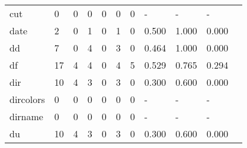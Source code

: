 \begin{longtable}{lp{1.10cm}p{1.10cm}p{1.10cm}p{1.10cm}p{1.10cm}p{1.10cm}p{1.10cm}p{1.10cm}p{1.10cm}p{1.10cm}}
cut       &                      0 &                                  0 &                                 0 &                                0 &                                 0 &                               0 &                              - &                                     - &                                   - \\
date      &                      2 &                                  0 &                                 1 &                                0 &                                 1 &                               0 &                          0.500 &                                 1.000 &                               0.000 \\
dd        &                      7 &                                  0 &                                 4 &                                0 &                                 3 &                               0 &                          0.464 &                                 1.000 &                               0.000 \\
df        &                     17 &                                  4 &                                 4 &                                0 &                                 4 &                               5 &                          0.529 &                                 0.765 &                               0.294 \\
dir       &                     10 &                                  4 &                                 3 &                                0 &                                 3 &                               0 &                          0.300 &                                 0.600 &                               0.000 \\
dircolors &                      0 &                                  0 &                                 0 &                                0 &                                 0 &                               0 &                              - &                                     - &                                   - \\
dirname   &                      0 &                                  0 &                                 0 &                                0 &                                 0 &                               0 &                              - &                                     - &                                   - \\
du        &                     10 &                                  4 &                                 3 &                                0 &                                 3 &                               0 &                          0.300 &                                 0.600 &                               0.000 \\

\end{longtable}
